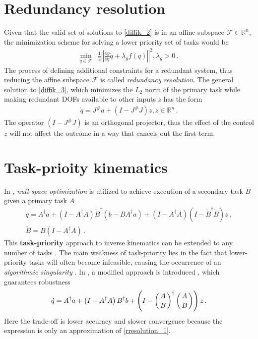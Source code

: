 \documentclass[times, utf8, diplomski, english]{fer}
\begin{document}
\section{Redundancy resolution}\label{section:redundancy resolution}
Given that the valid set of solutions to \eqref{diffik_2} is in an affine subspace $\mathcal{F} \in \mathbb{R}^n$, the minimization scheme for solving a lower priority set of tasks would be
\begin{align}
\label{diffik_3}
\min\limits_{\dot{q} \in \mathcal{F}} & \frac{1}{2}\left\Vert\frac{\partial g}{\partial q} \dot{q} + \lambda_{g}f\left(q\right)\right\Vert^2 , \lambda_{g} > 0\, .
\end{align}
The process of defining additional constraints for a redundant system, thus reducing the affine subspace $\mathcal{F}$ is called \textit{redundancy resolution}.
The general solution to \eqref{diffik_3}, which minimizes the $L_2$ norm of the primary task while making redundant DOFs available to other inputs $z$ has the form
\begin{align}
\label{rresolution_0}
\dot{q} = J^{\#}a + \left(I - J^{\#}J\right)z ,  z \in \mathbb{R}^n\, .
\end{align}
The operator $\left(I - J^{\#}J\right)$ is an orthogonal projector, thus the effect of the control $z$ will not affect the outcome in a way that cancels out the first term. 
\section{Task-prioity kinematics}\label{section:task priority}
In \citep{nakamura1987task,nakamura1990advanced}, \textit{null-space optimization} is utilized to achieve execution of a secondary task $B$ given a primary task $A$
\begin{subequations}
\begin{gather}
\label{rresolution_1}
\dot{q}  = A^{\dagger}a + \left(I - A^{\dagger}A\right)\tilde{B}^{\dagger}\left(b - BA^{\dagger}a\right) + 
\left(I - A^{\dagger}A\right) \left(I - \tilde{B}^{\dagger}\tilde{B}\right)z\, ,\\
\tilde{B}  = B\left(I - A^{\dagger}A\right)\, .
\end{gather}
\end{subequations}
This \textbf{task-priority} approach to inverse kinematics can be extended to any number of tasks \citep{slotine1991general}.
The main weakness of task-priority lies in the fact that lower-priority tasks will often become infeasible, causing the occurrence of an \textit{algorithmic singularity} \citep{baillieul1985kinematic}.
In \citep{chiaverini1997singularity}, a modified approach is introduced , which guarantees robustness 
\begin{align}
\label{rresolution_2}
\dot{q} = A^{\dagger}a + \left(I - A^{\dagger}A\right)B^{\dagger}b + 
\left(I - \left(A \atop B\right)^{\dagger}\left(A \atop B\right)\right)z\, .
\end{align}
Here the trade-off is lower accuracy and slower convergence because the expression is only an approximation of \eqref{rresolution_1}.
\end{document}

